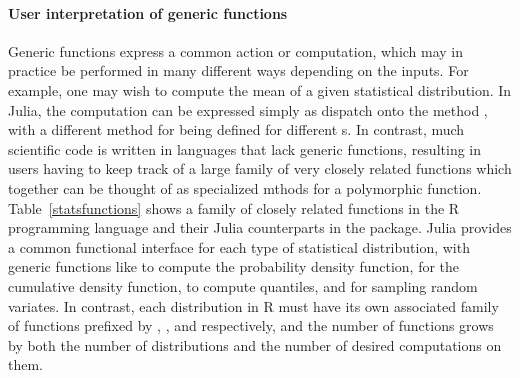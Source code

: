 \documentclass[pldi]{sigplanconf-pldi15}
\begin{document}
\paragraph{User interpretation of generic functions}
Generic functions express a common action or computation, which may in
practice be performed in many different ways depending on the inputs. For
example, one may wish to compute the mean of a given statistical distribution.
In Julia, the computation can be expressed simply as dispatch onto the method
, with a different method for  being
defined for different s. In contrast, much scientific code
is written in languages that lack generic functions, resulting in users having
to keep track of a large family of very closely related functions which
together can be thought of as specialized mthods for a polymorphic function.
Table~\ref{statsfunctions} shows a family of closely related functions in the R
programming language and their Julia counterparts in the
 package. Julia provides a common functional interface
for each type of statistical distribution, with generic functions like
 to compute the probability density function,  for the
cumulative density function,  to compute quantiles, and
 for sampling random variates. In contrast, each distribution in R
must have its own associated family of functions prefixed by ,
,  and  respectively, and the number of functions grows
by both the number of distributions and the number of desired computations on
them.
\end{document}
